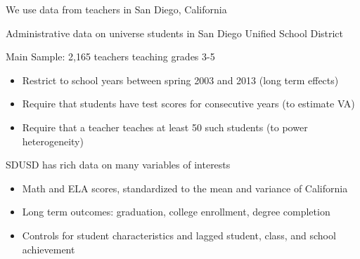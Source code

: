 \documentclass[t,aspectratio=169,11pt]{beamer}
\begin{document}
\begin{frame}{We use data from teachers in San Diego, California}


\begin{wideitemize}
    \item Administrative data on universe students in San Diego Unified School District

    \item<2-> Main Sample: 2,165 teachers teaching grades 3-5
        
    \begin{itemize}
        \item Restrict to school years between spring 2003 and 2013 (long term effects)
        \item Require that students have test scores for consecutive years (to estimate VA)
        \item Require that a teacher teaches at least 50 such students (to power heterogeneity)
    \end{itemize}    
         
        

    \item<3-> SDUSD has rich data on many variables of interests
        \begin{itemize}
        \item Math and ELA scores, standardized to the mean and variance of California
        \item Long term outcomes: graduation, college enrollment, degree completion
        \item Controls for student characteristics and lagged student, class, and school achievement
    \end{itemize}  
\end{wideitemize}
\end{frame}


\end{document}
